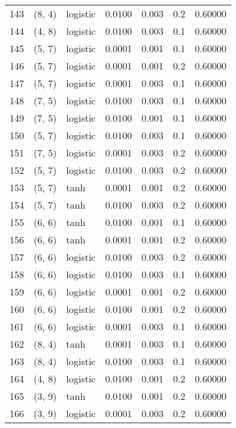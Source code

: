 \begin{tabular}{lllrrrr}
143 &      (8, 4) &  logistic &  0.0100 &  0.003 &  0.2 &   0.60000 \\
144 &      (4, 8) &  logistic &  0.0100 &  0.003 &  0.1 &   0.60000 \\
145 &      (5, 7) &  logistic &  0.0001 &  0.001 &  0.1 &   0.60000 \\
146 &      (5, 7) &  logistic &  0.0001 &  0.001 &  0.2 &   0.60000 \\
147 &      (5, 7) &  logistic &  0.0001 &  0.003 &  0.1 &   0.60000 \\
148 &      (7, 5) &  logistic &  0.0100 &  0.003 &  0.1 &   0.60000 \\
149 &      (7, 5) &  logistic &  0.0100 &  0.001 &  0.1 &   0.60000 \\
150 &      (5, 7) &  logistic &  0.0100 &  0.003 &  0.1 &   0.60000 \\
151 &      (7, 5) &  logistic &  0.0001 &  0.003 &  0.2 &   0.60000 \\
152 &      (5, 7) &  logistic &  0.0100 &  0.003 &  0.2 &   0.60000 \\
153 &      (5, 7) &      tanh &  0.0001 &  0.001 &  0.2 &   0.60000 \\
154 &      (5, 7) &      tanh &  0.0100 &  0.003 &  0.2 &   0.60000 \\
155 &      (6, 6) &      tanh &  0.0100 &  0.001 &  0.1 &   0.60000 \\
156 &      (6, 6) &      tanh &  0.0001 &  0.001 &  0.2 &   0.60000 \\
157 &      (6, 6) &  logistic &  0.0100 &  0.003 &  0.2 &   0.60000 \\
158 &      (6, 6) &  logistic &  0.0100 &  0.003 &  0.1 &   0.60000 \\
159 &      (6, 6) &  logistic &  0.0001 &  0.001 &  0.2 &   0.60000 \\
160 &      (6, 6) &  logistic &  0.0100 &  0.001 &  0.2 &   0.60000 \\
161 &      (6, 6) &  logistic &  0.0001 &  0.003 &  0.1 &   0.60000 \\
162 &      (8, 4) &      tanh &  0.0001 &  0.003 &  0.1 &   0.60000 \\
163 &      (8, 4) &  logistic &  0.0100 &  0.003 &  0.1 &   0.60000 \\
164 &      (4, 8) &  logistic &  0.0100 &  0.001 &  0.2 &   0.60000 \\
165 &      (3, 9) &      tanh &  0.0100 &  0.001 &  0.2 &   0.60000 \\
166 &      (3, 9) &  logistic &  0.0001 &  0.003 &  0.2 &   0.60000 \\

\end{tabular}
